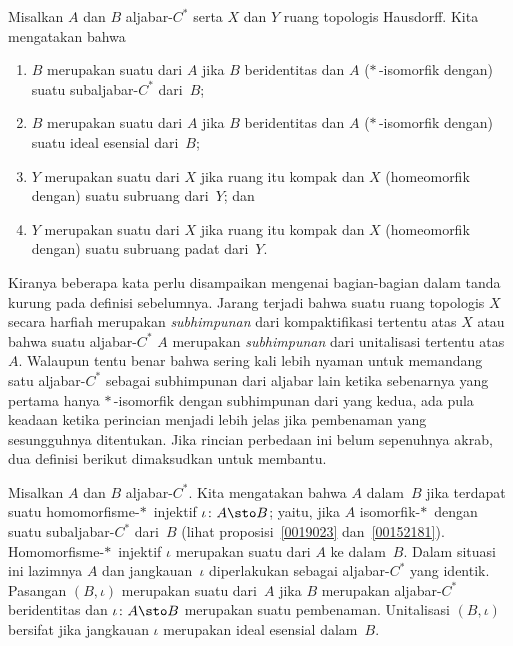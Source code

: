 \begin{defn}\label{0038614} Misalkan $A$ dan $B$ aljabar-$C^*$ serta $X$ dan $Y$
ruang topologis Hausdorff. Kita mengatakan bahwa
 \begin{enumerate}
    \item $B$ merupakan suatu  dari $A$ jika $B$ beridentitas dan $A$ ($*\,$-isomorfik
dengan) suatu subaljabar-$C^*$ dari~$B$;
    \item $B$ merupakan suatu  dari $A$ jika $B$ beridentitas dan $A$
($*\,$-isomorfik dengan) suatu ideal esensial dari~$B$;
    \item $Y$ merupakan suatu  dari $X$ jika ruang itu kompak dan $X$ (homeomorfik
dengan) suatu subruang dari~$Y$; dan
    \item $Y$ merupakan suatu  dari $X$ jika ruang itu kompak dan $X$
(homeomorfik dengan) suatu subruang padat dari~$Y$.
 \end{enumerate}
\end{defn}

Kiranya beberapa kata perlu disampaikan mengenai bagian-bagian dalam tanda kurung pada definisi
sebelumnya. Jarang terjadi bahwa suatu ruang topologis $X$ secara harfiah merupakan
\emph{subhimpunan} dari kompaktifikasi tertentu atas $X$ atau bahwa suatu aljabar-$C^*$ $A$ merupakan
\emph{subhimpunan} dari unitalisasi tertentu atas~$A$. Walaupun tentu benar bahwa sering kali
lebih nyaman untuk memandang satu aljabar-$C^*$ sebagai subhimpunan dari aljabar lain ketika sebenarnya yang
pertama hanya $*\,$-isomorfik dengan subhimpunan dari yang kedua, ada pula keadaan ketika
perincian menjadi lebih jelas jika pembenaman yang sesungguhnya ditentukan. Jika rincian perbedaan
ini belum sepenuhnya akrab, dua definisi berikut dimaksudkan untuk membantu.

\begin{defn} Misalkan $A$ dan $B$ aljabar-$C^*$. Kita mengatakan bahwa $A$
 dalam~$B$ jika terdapat suatu homomorfisme-$*\,$ injektif $\iota\colon A \sto
B$; yaitu, jika $A$ isomorfik-$*\,$ dengan suatu subaljabar-$C^*$ dari~$B$ (lihat
proposisi~\ref{0019023} dan~\ref{00152181}). Homomorfisme-$*\,$ injektif $\iota$
merupakan suatu
 dari $A$ ke dalam~$B$. Dalam situasi ini lazimnya $A$ dan
jangkauan~$\iota$ diperlakukan sebagai aljabar-$C^*$ yang identik. Pasangan $(B,\iota)$ merupakan suatu
 dari~$A$ jika $B$ merupakan aljabar-$C^*$ beridentitas dan $\iota\colon A \sto B$ merupakan suatu
pembenaman. Unitalisasi $(B,\iota)$ bersifat
 jika jangkauan $\iota$ merupakan ideal esensial dalam~$B$.
\end{defn}


